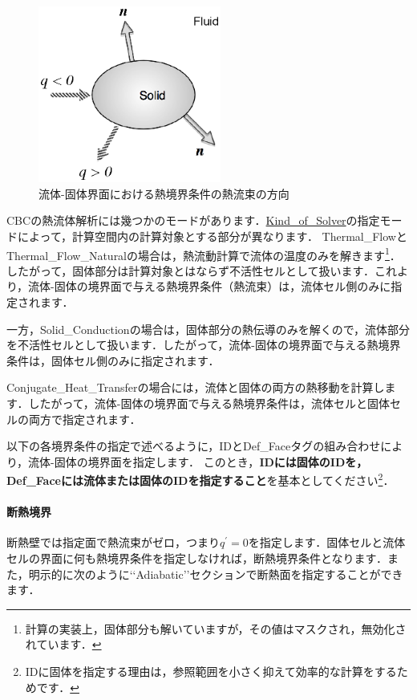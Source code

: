 \begin{figure}[htbp]
\begin{center}
\includegraphics[width=6cm,clip]{heatBC.eps}
\end{center}
\caption{流体-固体界面における熱境界条件の熱流束の方向}
\label{fig:heat bc on solid}
\end{figure}

CBCの熱流体解析には幾つかのモードがあります．\hyperlink{tgt:solver_property}{Kind\_of\_Solver}の指定モードによって，計算空間内の計算対象とする部分が異なります．
Thermal\_FlowとThermal\_Flow\_Naturalの場合は，熱流動計算で流体の温度のみを解きます\footnote{計算の実装上，固体部分も解いていますが，その値はマスクされ，無効化されています．}．したがって，固体部分は計算対象とはならず不活性セルとして扱います．これより，流体-固体の境界面で与える熱境界条件（熱流束）は，流体セル側のみに指定されます．

一方，Solid\_Conductionの場合は，固体部分の熱伝導のみを解くので，流体部分を不活性セルとして扱います．したがって，流体-固体の境界面で与える熱境界条件は，固体セル側のみに指定されます．

Conjugate\_Heat\_Transferの場合には，流体と固体の両方の熱移動を計算します．したがって，流体-固体の境界面で与える熱境界条件は，流体セルと固体セルの両方で指定されます．

以下の各境界条件の指定で述べるように，IDとDef\_Faceタグの組み合わせにより，流体-固体の境界面を指定します．
このとき，\textbf{IDには固体のIDを，Def\_Faceには流体または固体のIDを指定すること}を基本としてください\footnote{IDに固体を指定する理由は，参照範囲を小さく抑えて効率的な計算をするためです．}．

%
\paragraph{断熱境界}
断熱壁では指定面で熱流束がゼロ，つまり$q^{\prime}=0$を指定します．固体セルと流体セルの界面に何も熱境界条件を指定しなければ，断熱境界条件となります．また，明示的に次のように\lq\lq Adiabatic\rq\rq セクションで断熱面を指定することができます．

